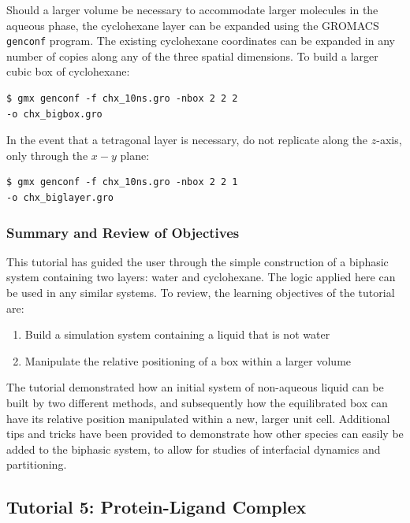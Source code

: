 \documentclass[9pt,tutorial]{livecoms}
\begin{document}
Should a larger volume be necessary to accommodate larger molecules in the aqueous phase, the cyclohexane layer can be expanded using the GROMACS \texttt{genconf} program. The existing cyclohexane coordinates can be expanded in any number of copies along any of the three spatial dimensions. To build a larger cubic box of cyclohexane:

\begin{verbatim}
$ gmx genconf -f chx_10ns.gro -nbox 2 2 2
-o chx_bigbox.gro
\end{verbatim}

In the event that a tetragonal layer is necessary, do not replicate along the $z$-axis, only through the $x-y$ plane:

\begin{verbatim}
$ gmx genconf -f chx_10ns.gro -nbox 2 2 1
-o chx_biglayer.gro
\end{verbatim}

\subsubsection{Summary and Review of Objectives} \label{biphasic_summary}

This tutorial has guided the user through the simple construction of a biphasic system containing two layers: water and cyclohexane. The logic applied here can be used in any similar systems. To review, the learning objectives of the tutorial are:

\begin{enumerate}
	\item Build a simulation system containing a liquid that is not water
	\item Manipulate the relative positioning of a box within a larger volume
\end{enumerate}

The tutorial demonstrated how an initial system of non-aqueous liquid can be built by two different methods, and subsequently how the equilibrated box can have its relative position manipulated within a new, larger unit cell. Additional tips and tricks have been provided to demonstrate how other species can easily be added to the biphasic system, to allow for studies of interfacial dynamics and partitioning.



\subsection{Tutorial 5: Protein-Ligand Complex} \label{prot_lig}
\end{document}
